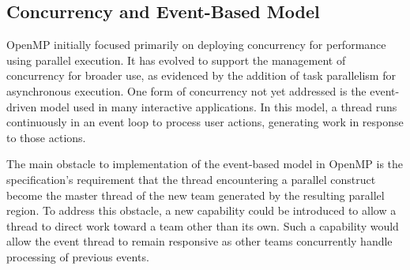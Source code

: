 \subsection{Concurrency and Event-Based Model}
\label{sub:concurrency_and_event_based_model}


OpenMP initially focused primarily on deploying concurrency for 
performance using parallel execution. It has evolved to support 
the management of concurrency for broader use, as evidenced by 
the addition of task parallelism for asynchronous execution. 
One form of concurrency not yet addressed is the event-driven 
model used in many interactive applications.  In this model, a  
thread runs continuously in an event loop to process user 
actions, generating work in response to those actions.  
 
The main obstacle to implementation of the event-based model in 
OpenMP is the specification's requirement that the thread 
encountering a parallel construct become the master thread of 
the new team generated by the resulting parallel region.  To 
address this obstacle, a new capability could be introduced to 
allow a thread to direct work toward a team other than its own. 
Such a capability would allow the event thread to remain 
responsive as other teams concurrently handle processing of 
previous events.

